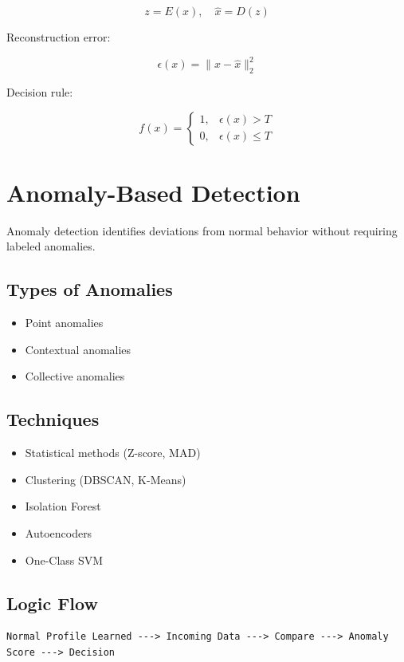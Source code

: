 \documentclass[12pt, draftclsnofoot, onecolumn]{IEEEtran}
\begin{document}
\[
z = E(x), \quad \hat{x} = D(z)
\]



Reconstruction error:


\[
\epsilon(x) = \|x - \hat{x}\|_2^2
\]



Decision rule:


\[
f(x) =
\begin{cases}
1, & \epsilon(x) > T \\
0, & \epsilon(x) \le T
\end{cases}
\]



\section{Anomaly-Based Detection}
Anomaly detection identifies deviations from normal behavior without requiring labeled anomalies.

\subsection{Types of Anomalies}
\begin{itemize}
\item Point anomalies
\item Contextual anomalies
\item Collective anomalies
\end{itemize}

\subsection{Techniques}
\begin{itemize}
\item Statistical methods (Z-score, MAD)
\item Clustering (DBSCAN, K-Means)
\item Isolation Forest
\item Autoencoders
\item One-Class SVM
\end{itemize}

\subsection{Logic Flow}
\begin{verbatim}
Normal Profile Learned ---> Incoming Data ---> Compare ---> Anomaly Score ---> Decision
\end{verbatim}
\end{document}
